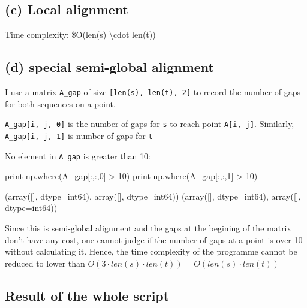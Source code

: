 \documentclass[]{article}
\newenvironment{Shaded}{}{}
\newcommand{\DecValTok}[1]{\textcolor[rgb]{0.25,0.63,0.44}{#1}}
\newcommand{\OperatorTok}[1]{\textcolor[rgb]{0.40,0.40,0.40}{#1}}
\newcommand{\BuiltInTok}[1]{#1}
\newcommand{\NormalTok}[1]{#1}
\begin{document}
\hypertarget{header-n59}{%
\subsection{(c) Local alignment}\label{header-n59}}

Time complexity: \$O(len(s) \textbackslash{}cdot len(t))

\hypertarget{header-n62}{%
\subsection{(d) special semi-global alignment}\label{header-n62}}

I use a matrix \texttt{A\_gap} of size
\texttt{{[}len(s),\ len(t),\ 2{]}} to record the number of gaps for both
sequences on a point.

\texttt{A\_gap{[}i,\ j,\ 0{]}} is the number of gaps for \texttt{s} to
reach point \texttt{A{[}i,\ j{]}}. Similarly,
\texttt{A\_gap{[}i,\ j,\ 1{]}} is number of gaps for \texttt{t}

No element in \texttt{A\_gap} is greater than 10:

\begin{Shaded}
\begin{Highlighting}[]
\BuiltInTok{print}\NormalTok{ np.where(A_gap[:,:,}\DecValTok{0}\NormalTok{] }\OperatorTok{>} \DecValTok{10}\NormalTok{)}
\BuiltInTok{print}\NormalTok{ np.where(A_gap[:,:,}\DecValTok{1}\NormalTok{] }\OperatorTok{>} \DecValTok{10}\NormalTok{)}

\NormalTok{(array([], dtype}\OperatorTok{=}\NormalTok{int64), array([], dtype}\OperatorTok{=}\NormalTok{int64))}
\NormalTok{(array([], dtype}\OperatorTok{=}\NormalTok{int64), array([], dtype}\OperatorTok{=}\NormalTok{int64))}
\end{Highlighting}
\end{Shaded}

Since this is semi-global alignment and the gaps at the begining of the
matrix don't have any cost, one cannot judge if the number of gaps at a
point is over 10 without calculating it. Hence, the time complexity of
the programme cannot be reduced to lower than
\(O(3 \cdot len(s) \cdot len(t)) =O(len(s) \cdot len(t))\)

\hypertarget{header-n78}{%
\subsection{Result of the whole script}\label{header-n78}}
\end{document}
